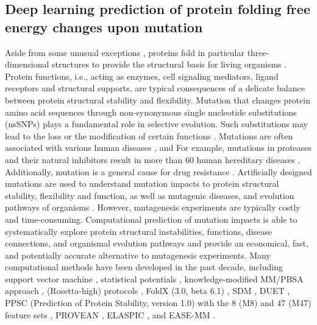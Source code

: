 \documentclass[10pt]{article}
\begin{document}
\subsection{Deep learning prediction of protein folding free energy changes upon mutation}



Aside from some unusual exceptions \cite{Schroder:2005,Chiti:2006}, proteins fold in particular three-dimensional structures to provide the structural basis for living organisms \cite{Anfinsen:1973}. Protein functions, i.e., acting as enzymes, cell signaling mediators, ligand receptors and structural supports, are typical   consequences of a delicate balance between protein structural stability and flexibility.  
Mutation that changes protein amino acid sequences through non-synonymous single nucleotide substitutions (nsSNPs) plays a fundamental role in selective evolution. Such substitutions may   lead to the loss or the modification of certain functions \cite{PYue:2005}. 
Mutations are often associated with various human diseases \cite{ZZhang:2012, Kucukkal:2015}, and 
For example, mutations in proteases and their natural inhibitors result in more than 60 human hereditary diseases \cite{Puente:2003}. Additionally, mutation is a general cause for  drug resistance  \cite{Martinez:2000}. 
Artificially designed mutations are used to understand mutation impacts to protein   structural stability, flexibility and function, as well as  mutagenic diseases, and evolution pathways of organisms   \cite{Fersht:2078}. However,  mutagenesis experiments  are typically costly and time-consuming. Computational prediction of mutation  impacts is able to systematically explore protein structural instabilities, functions, disease connections, and organismal evolution pathways \cite{Guerois:2002} and provide an economical, fast, and potentially accurate alternative to mutagenesis experiments.  Many  computational methods have been developed in the past decade,  including support vector machine  \cite{Capriotti:2005}, statistical potentials \cite{Dehouck:2009}, knowledge-modified MM/PBSA approach  \cite{Getov:2016},  (Rosetta-high) protocols \cite{Kellogg:2011},    FoldX (3.0, beta 6.1) \cite{Guerois:2002},   SDM \cite{Worth:2011},  DUET \cite{Pires:2014b},  PPSC (Prediction of Protein Stability, version 1.0) with the 8 (M8) and 47 (M47) feature sets \cite{YYang:2013},  PROVEAN \cite{YChoi:2012}, ELASPIC  \cite{Berliner:2014}, and EASE-MM \cite{Folkman:2016}. 
 
\end{document}
